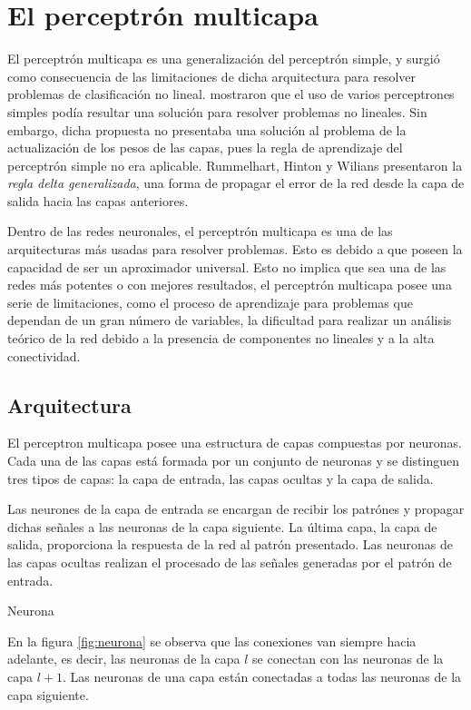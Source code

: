 \section{El perceptrón multicapa}
El perceptrón multicapa es una generalización del perceptrón simple, y surgió como consecuencia de las limitaciones de dicha arquitectura para resolver problemas de clasificación no lineal.  mostraron que el uso de varios perceptrones simples podía resultar una solución para resolver problemas no lineales. Sin embargo, dicha propuesta no presentaba una solución al problema de la actualización de los pesos de las capas, pues la regla de aprendizaje del perceptrón simple no era aplicable. Rummelhart, Hinton y Wilians presentaron la {\em regla delta generalizada}, una forma de propagar el error de la red desde la capa de salida hacia las capas anteriores.

Dentro de las redes neuronales, el perceptrón multicapa es una de las arquitecturas más usadas para resolver problemas. Esto es debido a que poseen la capacidad de ser un aproximador universal. Esto no implica que sea una de las redes más potentes o con mejores resultados, el perceptrón multicapa posee una serie de limitaciones, como el proceso de aprendizaje para problemas que dependan de un gran número de variables, la dificultad para realizar un análisis teórico de la red debido a la presencia de componentes no lineales y a la alta conectividad.

\subsection{Arquitectura}
El perceptron multicapa posee una estructura de capas compuestas por neuronas. Cada una de las capas está formada por un conjunto de neuronas y se distinguen tres tipos de capas: la capa de entrada, las capas ocultas y la capa de salida.

Las neurones de la capa de entrada se encargan de recibir los patrónes y propagar dichas señales a las neuronas de la capa siguiente. La última capa, la capa de salida, proporciona la respuesta de la red al patrón presentado. Las neuronas de las capas ocultas realizan el procesado de las señales generadas por el patrón de entrada.
\begin{imagen}
	\scalebox{0.8}{}
	\caption{Neurona}
	\label{fig:neurona}
\end{imagen}

En la figura \ref{fig:neurona} se observa que las conexiones van siempre hacia adelante, es decir, las neuronas de la capa $l$ se conectan con las neuronas de la capa $l + 1$. Las neuronas de una capa están conectadas a todas las neuronas de la capa siguiente.

